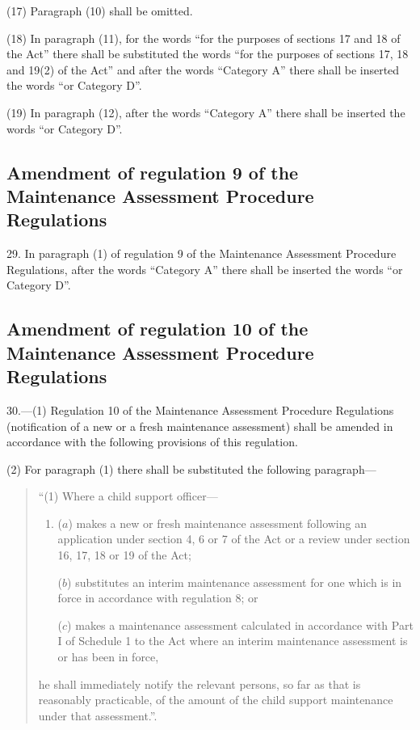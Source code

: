 \documentclass[a4paper]{article}
\begin{document}
(17) Paragraph (10) shall be omitted.

(18) In paragraph (11), for the words “for the purposes of sections 17 and 18 of the Act” there shall be substituted the words “for the purposes of sections 17, 18 and 19(2) of the Act” and after the words “Category A” there shall be inserted the words “or Category D”.

(19) In paragraph (12), after the words “Category A” there shall be inserted the words “or Category D”.

\subsection[29. Amendment of regulation 9 of the Maintenance Assessment Procedure Regulations]{\sloppy Amendment of regulation 9 of the Maintenance Assessment Procedure Regulations}

29.  In paragraph (1) of regulation 9 of the Maintenance Assessment Procedure Regulations, after the words “Category A” there shall be inserted the words “or Category D”.

\subsection[30. Amendment of regulation 10 of the Maintenance Assessment Procedure Regulations]{Amendment of regulation 10 of the Maintenance Assessment Procedure Regulations}

30.—(1) Regulation 10 of the Maintenance Assessment Procedure Regulations (notification of a new or a fresh maintenance assessment) shall be amended in accordance with the following provisions of this regulation.

(2) For paragraph (1) there shall be substituted the following paragraph—
\begin{quotation}
“(1) Where a child support officer—
\begin{enumerate}\item[]
($a$) makes a new or fresh maintenance assessment following an application under section 4, 6 or 7 of the Act or a review under section 16, 17, 18 or 19 of the Act;

($b$) substitutes an interim maintenance assessment for one which is in force in accordance with regulation 8; or

($c$) makes a maintenance assessment calculated in accordance with Part I of Schedule 1 to the Act where an interim maintenance assessment is or has been in force,
\end{enumerate}
he shall immediately notify the relevant persons, so far as that is reasonably practicable, of the amount of the child support maintenance under that assessment.”.
\end{quotation}
\end{document}
